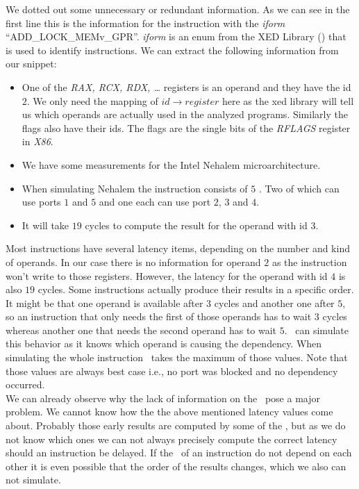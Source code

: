 We dotted out some unnecessary or redundant information. As we can see in the first line this is the information for the instruction with the \emph{iform} ``ADD\_LOCK\_MEMv\_GPR''. \emph{iform} is an enum from the XED Library (\cite{xed}) that is used to identify instructions. We can extract the following information from our snippet:

\begin{itemize}
    \item One of the \emph{RAX, RCX, RDX, \dots} registers is an operand and they have the id $2$. We only need the mapping of $id \rightarrow register$ here as the xed library will tell us which operands are actually used in the analyzed programs. Similarly the flags also have their ids. The flags are the single bits of the \emph{RFLAGS} register in \emph{X86}.
    \item We have some measurements for the Intel Nehalem microarchitecture.
    \item When simulating Nehalem the instruction consists of $5$ \microops. Two of which can use ports $1$ and $5$ and one each can use port $2$, $3$ and $4$.
    \item It will take $19$ cycles to compute the result for the operand with id $3$.
\end{itemize}

Most instructions have several latency items, depending on the number and kind of operands. In our case there is no information for operand $2$ as the instruction won't write to those registers. However, the latency for the operand with id $4$ is also $19$ cycles. Some instructions actually produce their results in a specific order. It might be that one operand is available after $3$ cycles and another one after $5$, so an instruction that only needs the first of those operands has to wait $3$ cycles whereas another one that needs the second operand has to wait $5$. \suaca\ can simulate this behavior as it knows which operand is causing the dependency. When simulating the whole instruction \suaca\ takes the maximum of those values. Note that those values are always best case i.e., no port was blocked and no dependency occurred.\\
We can already observe why the lack of information on the \microops\ pose a major problem. We cannot know how the the above mentioned latency values come about. Probably those early results are computed by some of the \microops, but as we do not know which ones we can not always precisely compute the correct latency should an instruction be delayed. If the \microops\ of an instruction do not depend on each other it is even possible that the order of the results changes, which we also can not simulate.

